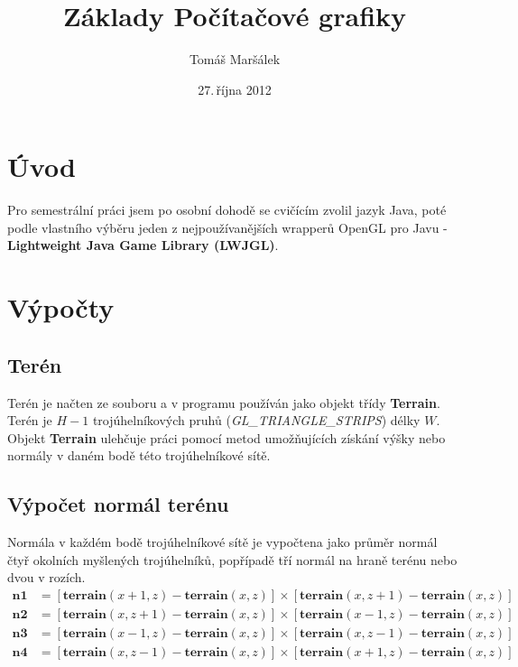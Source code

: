 \documentclass[11pt]{article}
\title{Základy Počítačové grafiky}
\author{Tomáš Maršálek}
\date{27.\,října 2012}
\begin{document}
\maketitle
\section{Úvod}
Pro semestrální práci jsem po osobní dohodě se cvičícím zvolil jazyk Java, poté
podle vlastního výběru jeden z nejpoužívanějších wrapperů OpenGL pro Javu -
\textbf {Lightweight Java Game Library (LWJGL)}.


\section{Výpočty}
\subsection{Terén}
Terén je načten ze souboru a v programu používán jako objekt třídy
\textbf{Terrain}. Terén je $H - 1$ trojúhelníkových pruhů
(\textit{GL\_TRIANGLE\_STRIPS}) délky $W$. Objekt \textbf{Terrain} ulehčuje
práci pomocí metod umožňujících získání výšky nebo normály v daném bodě
této trojúhelníkové sítě.

\subsection{Výpočet normál terénu}
Normála v každém bodě trojúhelníkové sítě je vypočtena jako průměr normál čtyř
okolních myšlených trojúhelníků, popřípadě tří normál na hraně terénu nebo dvou
v rozích. \\

\begin{align*}
\mathbf {n1} &= \left[ \mathbf {terrain}(x + 1, z) - \mathbf {terrain}(x, z)
\right] \times \left[ \mathbf {terrain}(x, z + 1) - \mathbf {terrain}(x, z)
\right] \\
%
\mathbf {n2} &= \left[ \mathbf {terrain}(x, z + 1) - \mathbf {terrain}(x, z)
\right] \times \left[ \mathbf {terrain}(x - 1, z) - \mathbf {terrain}(x, z)
\right] \\
%
\mathbf {n3} &= \left[ \mathbf {terrain}(x - 1, z) - \mathbf {terrain}(x, z)
\right] \times \left[ \mathbf {terrain}(x, z - 1) - \mathbf {terrain}(x, z)
\right] \\
%
\mathbf {n4} &= \left[ \mathbf {terrain}(x, z - 1) - \mathbf {terrain}(x, z)
\right] \times \left[ \mathbf {terrain}(x + 1, z) - \mathbf {terrain}(x, z)
\right] \\
\end{align*}
\end{document}

